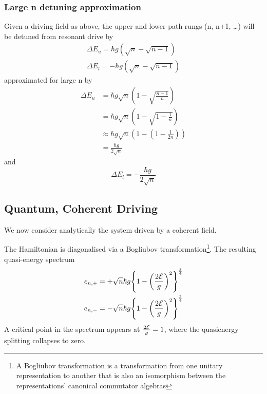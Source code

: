 \subsubsection{Large n detuning approximation}\cite{Alsing1990}
Given a driving field as above, the upper and lower path rungs (n, n+1, \dots) will be detuned from resonant drive by
\begin{align}
  \Delta E_u = \hbar g (\sqrt{n}-\sqrt{n-1}) \\
  \Delta E_l = -\hbar g (\sqrt{n}-\sqrt{n-1})
\end{align}
approximated for large n by
\begin{align}
  \Delta E_u &= \hbar g \sqrt{n} \left (1-\sqrt{\frac{n-1}{n}} \right ) \\
  &= \hbar g \sqrt{n} \left (1-\sqrt{1-\frac{1}{n}} \right ) \\
  & \approx \hbar g \sqrt{n} \left ( 1- \left ( 1 - \frac{1}{2n} \right ) \right ) \\
  &= \frac{\hbar g}{2 \sqrt{n}}
\end{align}
and
\begin{equation}
  \Delta E_l = -\frac{\hbar g}{2 \sqrt{n}}
\end{equation}

\subsection{Quantum, Coherent Driving}
We now consider analytically the system driven by a coherent field.

The Hamiltonian is diagonalised via a Bogliubov transformation\footnote{A Bogliubov transformation is a transformation from one unitary representation to another that is also an isomorphism between the representations' canonical commutator algebras}. The resulting quasi-energy spectrum
\begin{align}
  e_{n, +} &= + \sqrt{n} \hbar g {\left \{1 - {\left ({\frac{2\mathcal{E}}{g}} \right )}^2 \right \}}^{\frac{3}{4}} \\
  e_{n, -} &= - \sqrt{n} \hbar g {\left \{1 - {\left ({\frac{2\mathcal{E}}{g}} \right )}^2 \right \}}^{\frac{3}{4}}
\end{align}
A critical point in the spectrum appears at $\frac{2\mathcal{E}}{g} = 1$, where the quasienergy splitting collapses to zero.

